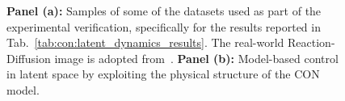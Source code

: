 \begin{figure}[t]
    \centering
    \hfill
    \caption{\textbf{Panel (a):} Samples of some of the datasets used as part of the experimental verification, specifically for the results reported in Tab.~\ref{tab:con:latent_dynamics_results}. The real-world Reaction-Diffusion image is adopted from~\cite{epstein2016reaction}. \textbf{Panel (b):} Model-based control in latent space by exploiting the physical structure of the CON model.}
\end{figure}

